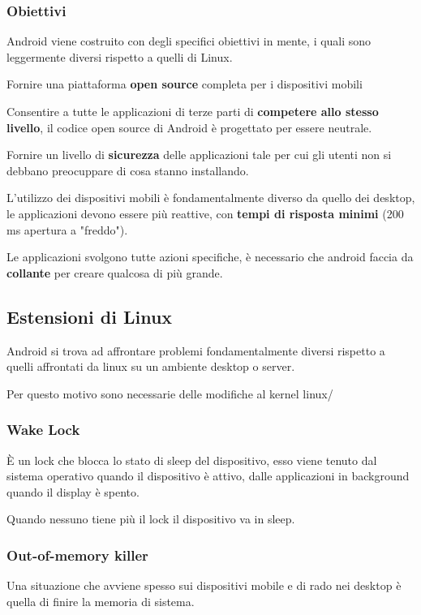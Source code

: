 \subsubsection{Obiettivi}
Android viene costruito con degli specifici obiettivi in mente, i quali sono leggermente diversi rispetto a quelli di Linux.
\begin{sitemize}
    \item Fornire una piattaforma \textbf{open source} completa per i dispositivi mobili
    \item Consentire a tutte le applicazioni di terze parti di \textbf{competere allo stesso livello}, il codice open source di Android è progettato per essere neutrale.
    \item Fornire un livello di \textbf{sicurezza} delle applicazioni tale per cui gli utenti non si debbano preocuppare di cosa stanno installando.
    \item L'utilizzo dei dispositivi mobili è fondamentalmente diverso da quello dei desktop, le applicazioni devono essere più reattive, con \textbf{tempi di risposta minimi} (200 ms apertura a "freddo").
    \item Le applicazioni svolgono tutte azioni specifiche, è necessario che android faccia da \textbf{collante} per creare qualcosa di più grande.
\end{sitemize}

\subsection{Estensioni di Linux}
Android si trova ad affrontare problemi fondamentalmente diversi rispetto a quelli affrontati da linux su un ambiente desktop o server.

Per questo motivo sono necessarie delle modifiche al kernel linux/

\subsubsection{Wake Lock}
È un lock che blocca lo stato di sleep del dispositivo, esso viene tenuto dal sistema operativo quando il dispositivo è attivo, dalle applicazioni in background quando il display è spento.

Quando nessuno tiene più il lock il dispositivo va in sleep.

\subsubsection{Out-of-memory killer}
Una situazione che avviene spesso sui dispositivi mobile e di rado nei desktop è quella di finire la memoria di sistema.

